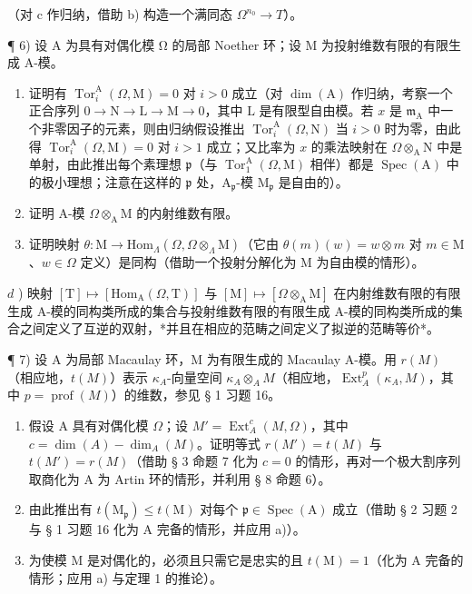 （对 c 作归纳，借助 b) 构造一个满同态 \(\Omega^{n_{0}} \to T\)）。

¶ 6) 设 A 为具有对偶化模 Ω 的局部 Noether 环；设 M 为投射维数有限的有限生成 A-模。

\begin{enumerate}
\def\labelenumi{\alph{enumi})}
\item
  证明有 \(\operatorname{Tor}_{i}^{\mathrm{A}}(\Omega, \mathrm{M}) = 0\) 对 \(i > 0\) 成立（对 \(\dim(\mathrm{A})\) 作归纳，考察一个正合序列 \(0 \to \mathrm{N} \to \mathrm{L} \to \mathrm{M} \to 0\)，其中 \(\mathrm{L}\) 是有限型自由模。若 \(x\) 是 \(\mathfrak{m}_{\mathrm{A}}\) 中一个非零因子的元素，则由归纳假设推出 \(\operatorname{Tor}_{i}^{\mathrm{A}}(\Omega, \mathrm{N})\) 当 \(i > 0\) 时为零，由此得 \(\operatorname{Tor}_{i}^{\mathrm{A}}(\Omega, \mathrm{M}) = 0\) 对 \(i > 1\) 成立；又比率为 \(x\) 的乘法映射在 \(\Omega \otimes_{\mathrm{A}} \mathrm{N}\) 中是单射，由此推出每个素理想 \(\mathfrak{p}\)（与 \(\operatorname{Tor}_{1}^{\mathrm{A}}(\Omega, \mathrm{M})\) 相伴）都是 \(\operatorname{Spec}(\mathrm{A})\) 中的极小理想；注意在这样的 \(\mathfrak{p}\) 处，\(\mathrm{A}_{\mathfrak{p}}\)-模 \(\mathrm{M}_{\mathfrak{p}}\) 是自由的）。
\item
  证明 A-模 \(\Omega\otimes_{\mathrm{A}}\mathrm{M}\) 的内射维数有限。
\item
  证明映射 \(\theta: \mathrm{M} \to \mathrm{Hom}_{\Lambda}(\Omega, \Omega \otimes_{\Lambda} \mathrm{M})\)（它由 \(\theta(m)(w) = w \otimes m\) 对 \(m \in \mathrm{M}\)、\(w \in \Omega\) 定义）是同构（借助一个投射分解化为 M 为自由模的情形）。
\end{enumerate}

\(d\) ) 映射 \([\mathrm{T}] \mapsto [\mathrm{Hom}_{\mathrm{A}}(\Omega, \mathrm{T})]\) 与 \([\mathrm{M}] \mapsto [\Omega \otimes_{\mathrm{A}} \mathrm{M}]\) 在内射维数有限的有限生成 A-模的同构类所成的集合与投射维数有限的有限生成 A-模的同构类所成的集合之间定义了互逆的双射，*并且在相应的范畴之间定义了拟逆的范畴等价*。

¶ 7) 设 A 为局部 Macaulay 环，M 为有限生成的 Macaulay A-模。用 \(r(M)\)（相应地，\(t(M)\)）表示 \(\kappa_{A}\)-向量空间 \(\kappa_{A} \otimes_{A} M\)（相应地，\(\operatorname{Ext}_{A}^{p}(\kappa_{A}, M)\)，其中 \(p = \operatorname{prof}(M)\)）的维数，参见 § 1 习题 16。

\begin{enumerate}
\def\labelenumi{\alph{enumi})}
\item
  假设 A 具有对偶化模 \(\Omega\)；设 \(M' = \operatorname{Ext}_A^c(M, \Omega)\)，其中 \(c = \dim(A) - \dim_A(M)\)。证明等式 \(r(M') = t(M)\) 与 \(t(M') = r(M)\)（借助 § 3 命题 7 化为 \(c = 0\) 的情形，再对一个极大割序列取商化为 A 为 Artin 环的情形，并利用 § 8 命题 6）。
\item
  由此推出有 \(t(\mathrm{M}_{\mathfrak{p}}) \leqslant t(\mathrm{M})\) 对每个 \(\mathfrak{p} \in \operatorname{Spec}(\mathrm{A})\) 成立（借助 § 2 习题 2 与 § 1 习题 16 化为 A 完备的情形，并应用 a)）。
\item
  为使模 M 是对偶化的，必须且只需它是忠实的且 \(t(\mathrm{M}) = 1\)（化为 A 完备的情形；应用 a) 与定理 1 的推论）。
\end{enumerate}

